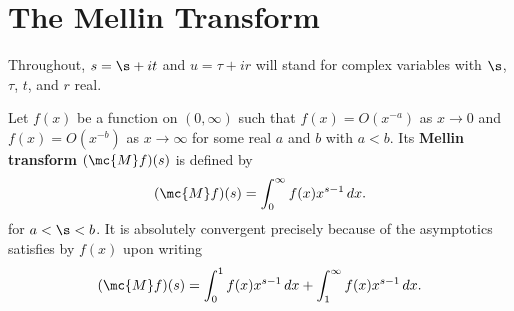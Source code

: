\chapter{The Mellin Transform}
  Throughout, \(s = \s+it\) and \(u = \tau+ir\) will stand for complex variables with \(\s\), \(\tau\), \(t\), and \(r\) real.

  Let \(f(x)\) be a function on \((0,\infty)\) such that \(f(x) = O(x^{-a})\) as \(x \to 0\) and \(f(x) = O(x^{-b})\) as \(x \to \infty\) for some real \(a\) and \(b\) with \(a < b\). Its \textbf{Mellin transform} \((\mc{M}f)(s)\) is defined by
  \[
    (\mc{M}f)(s) = \int_{0}^{\infty}f(x)x^{s-1}\,dx.
  \]
  for \(a < \s < b\). It is absolutely convergent precisely because of the asymptotics satisfies by \(f(x)\) upon writing
  \[
    (\mc{M}f)(s) = \int_{0}^{1}f(x)x^{s-1}\,dx+\int_{1}^{\infty}f(x)x^{s-1}\,dx.
  \]